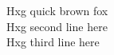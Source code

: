 \documentclass[a4paper,10pt]{article}
\begin{document}
Hxg quick brown fox\\
Hxg second line here\\
Hxg third line here
\end{document}
